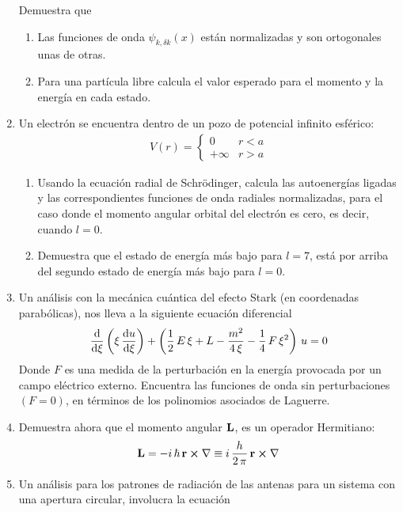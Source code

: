\begin{enumerate}
Demuestra que
\begin{enumerate}
\item Las funciones de onda $\psi_{k, \delta k} (x)$ están normalizadas y son ortogonales unas de otras.
\item Para una partícula libre calcula el valor esperado para el momento y la energía en cada estado. 
\end{enumerate}
\item Un electrón se encuentra dentro de un pozo de potencial infinito esférico:
\begin{align*}
V(r) = \begin{cases}
0 & r < a \\
+\infty & r > a
\end{cases}
\end{align*}
\begin{enumerate}
\item Usando la ecuación radial de Schrödinger, calcula las autoenergías ligadas y las correspondientes funciones de onda radiales normalizadas, para el caso donde el momento angular orbital del electrón es cero, es decir, cuando $l = 0$.
\item Demuestra que el estado de energía más bajo para $l = 7$, está por arriba del segundo estado de energía más bajo para $l = 0$.
\end{enumerate}
\item Un análisis con la mecánica cuántica del efecto Stark (en coordenadas parabólicas), nos lleva a la siguiente ecuación diferencial
\begin{align*}
\dv{\xi} \left( \xi \, \dv{u}{\xi}  \right) + \left( \dfrac{1}{2} \, E \, \xi + L - \dfrac{m^{2}}{4 \, \xi} - \dfrac{1}{4} \, F \, \xi^{2} \right) \, u = 0
\end{align*}
Donde $F$ es una medida de la perturbación en la energía provocada por un campo eléctrico externo. Encuentra las funciones de onda sin perturbaciones $(F=0)$, en términos de los polinomios asociados de Laguerre.
\item Demuestra ahora que el momento angular $\vb{L}$, es un operador Hermitiano:
\begin{align*}
\vb{L} = - i\, \hbar \, \vb{r} \cp \nabla \equiv i \, \dfrac{h}{2 \, \pi} \, \vb{r} \cp \nabla
\end{align*}
\item Un análisis para los patrones de radiación de las antenas para un sistema con una apertura circular, involucra la ecuación

\end{enumerate}
